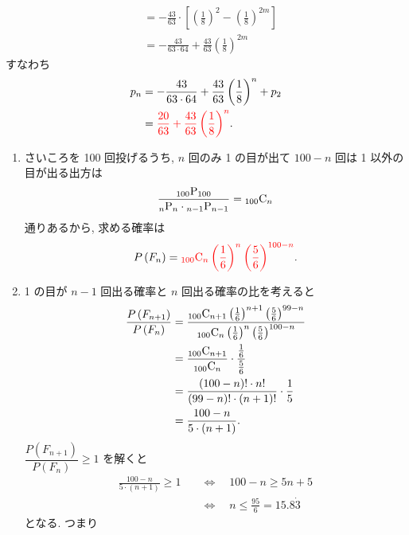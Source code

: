 \begin{qenumerate}
{\begin{enumerate}
{\begin{align}
						&= -\frac{43}{63}\cdot\left[\left(\frac{1}{8}\right)^{2} - \left(\frac{1}{8}\right)^{2m}\right] \\
						&= -\frac{43}{63\cdot 64} + \frac{43}{63}\left(\frac{1}{8}\right)^{2m}
				\end{align}
				すなわち
				\begin{align}
					p_{n} &= -\frac{43}{63\cdot 64} + \frac{43}{63}\left(\frac{1}{8}\right)^{n} + p_{2} \\
						&= \textcolor{red}{\frac{20}{63} + \frac{43}{63}\left(\frac{1}{8}\right)^{n}}.
				\end{align}
			}
		\end{enumerate}
	}
	\item{
		\begin{enumerate}
			\item{
				さいころを 100 回投げるうち, $n$ 回のみ 1 の目が出て $100 - n$ 回は 1 以外の目が出る出方は
				\begin{align}
					\frac{{{}_{100}\mathrm{P}_{100}}}{{{}_{n}\mathrm{P}_{n}}\cdot{{}_{n - 1}\mathrm{P}_{n - 1}}} = {{}_{100}\mathrm{C}_{n}}
				\end{align}
				通りあるから, 求める確率は
				\begin{align}
					P\left(F_{n}\right) = \textcolor{red}{{{}_{100}\mathrm{C}_{n}}\left(\frac{1}{6}\right)^{n}\left(\frac{5}{6}\right)^{100 - n}}.
				\end{align}
			}
			\item{
				1 の目が $n - 1$ 回出る確率と $n$ 回出る確率の比を考えると
				\begin{align}
					\frac{P\left(F_{n + 1}\right)}{P\left(F_{n}\right)} &= \frac{{{}_{100}\mathrm{C}_{n + 1}}\left(\frac{1}{6}\right)^{n + 1}\left(\frac{5}{6}\right)^{99 - n}}{{{}_{100}\mathrm{C}_{n}}\left(\frac{1}{6}\right)^{n}\left(\frac{5}{6}\right)^{100 - n}} \\
						&= \frac{{{}_{100}\mathrm{C}_{n + 1}}}{{{}_{100}\mathrm{C}_{n}}}\cdot\frac{\frac{1}{6}}{\frac{5}{6}} \\
						&= \frac{(100 - n)!\cdot n!}{(99 - n)!\cdot (n + 1)!}\cdot\frac{1}{5} \\
						&= \frac{100 - n}{5\cdot(n + 1)}.
				\end{align}
				$\dfrac{P\left(F_{n + 1}\right)}{P\left(F_{n}\right)}\geq1$ を解くと
				\begin{align}
					\frac{100 - n}{5\cdot(n + 1)}\geq 1 &\quad\Leftrightarrow\quad 100 - n\geq 5n + 5 \\
						&\quad\Leftrightarrow\quad n\leq\frac{95}{6} = 15.8\dot{3}
				\end{align}
				となる.
				つまり
				\begin{align}

\end{align}}
\end{enumerate}}
\end{qenumerate}
